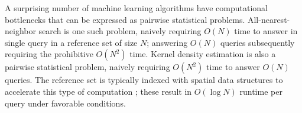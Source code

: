 \documentclass{article} %
\begin{document}
%
%
A surprising number of machine learning algorithms have computational
bottlenecks that can be expressed as pairwise statistical problems.
All-nearest-neighbor search is one such problem, naively requiring $O(N)$ time
to answer in single query in a reference set of size $N$; answering $O(N)$
queries subsequently requiring the prohibitive $O(N^2)$ time. Kernel density
estimation is also a pairwise statistical problem, naively requiring $O(N^2)$
time to answer $O(N)$ queries. The reference set is typically indexed with
spatial data structures to accelerate this type of computation
\cite{finkel1974quad, langford2006}; these result in $O(\log N)$ runtime per
query under favorable conditions.
\end{document}
